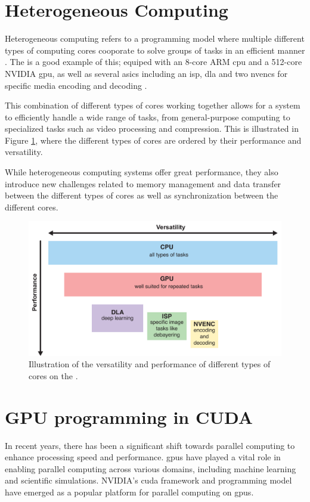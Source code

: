 \section{Heterogeneous Computing}
Heterogeneous computing refers to a programming model where multiple different types of computing cores cooporate to solve groups of tasks in an efficient manner \cite{armWhatHeterogenousCompute}.
The \jx is a good example of this; equiped with an 8-core ARM \gls{cpu} and a 512-core NVIDIA \gls{gpu}, as well as several \glspl{asic} including an \gls{isp}, \gls{dla} and two \glspl{nvenc} for specific media encoding and decoding \cite[9, 8, 23, 15-22]{nvidiaNVIDIAJetsonAGX2019}.

This combination of different types of cores working together allows for a system to efficiently handle a wide range of tasks, from general-purpose computing to specialized tasks such as video processing and compression.
This is illustrated in Figure \ref{fig:jx_hierarchy}, where the different types of cores are ordered by their performance and versatility.

While heterogeneous computing systems offer great performance, they also introduce new challenges related to memory management and data transfer between the different types of cores as well as synchronization between the different cores.

\begin{figure}[H]
    \centering
    \includegraphics[width=\textwidth]{figures/PDF/jx_hierarchy.pdf}
    \caption{Illustration of the versatility and performance of different types of cores on the \jx.}
    \label{fig:jx_hierarchy}
\end{figure}


\section{GPU programming in CUDA}
In recent years, there has been a significant shift towards parallel computing to enhance processing speed and performance.
\glspl{gpu} have played a vital role in enabling parallel computing across various domains, including machine learning and scientific simulations.
NVIDIA's \gls{cuda} framework and programming model have emerged as a popular platform for parallel computing on \glspl{gpu}.


